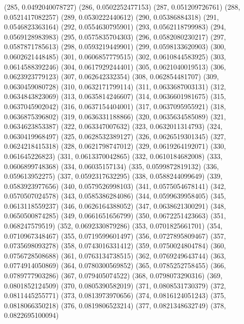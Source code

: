 {					(285, 0.0492040078727)
					(286, 0.0502252477153)
					(287, 0.051209726761)
					(288, 0.0521417082257)
					(289, 0.0530222440612)
					(290, 0.05386884318)
					(291, 0.0546823363164)
					(292, 0.0554630795901)
					(293, 0.0562118799983)
					(294, 0.0569128983983)
					(295, 0.0575835704303)
					(296, 0.0582080230217)
					(297, 0.0587871785613)
					(298, 0.0593219449901)
					(299, 0.0598133620903)
					(300, 0.0602621448485)
					(301, 0.0606857779515)
					(302, 0.0610844583925)
					(303, 0.0614588392246)
					(304, 0.0617929244401)
					(305, 0.0621040019513)
					(306, 0.0623923779123)
					(307, 0.062642332354)
					(308, 0.062854481707)
					(309, 0.0630459080728)
					(310, 0.0632171799114)
					(311, 0.0633687003131)
					(312, 0.0634843823069)
					(313, 0.0635814246607)
					(314, 0.0636601981675)
					(315, 0.0637045902042)
					(316, 0.0637154404001)
					(317, 0.0637095955921)
					(318, 0.0636875396802)
					(319, 0.0636331188866)
					(320, 0.0635634585089)
					(321, 0.0634623853387)
					(322, 0.063347007632)
					(323, 0.0632011314793)
					(324, 0.0630419968497)
					(325, 0.0628532389127)
					(326, 0.0626519301345)
					(327, 0.0624218415318)
					(328, 0.0621798747012)
					(329, 0.0619264192071)
					(330, 0.061645226823)
					(331, 0.0613370042865)
					(332, 0.0610184682008)
					(333, 0.0606899748368)
					(334, 0.06035157134)
					(335, 0.0599872819132)
					(336, 0.059613952275)
					(337, 0.0592317632295)
					(338, 0.0588244099649)
					(339, 0.0583923977656)
					(340, 0.0579526998103)
					(341, 0.0575054678141)
					(342, 0.0570507024578)
					(343, 0.0585386284086)
					(344, 0.0599639958405)
					(345, 0.0613118559237)
					(346, 0.0626164388052)
					(347, 0.0638621300291)
					(348, 0.0650500874285)
					(349, 0.0661651656799)
					(350, 0.0672251423663)
					(351, 0.068247579519)
					(352, 0.0692330879286)
					(353, 0.0701825661701)
					(354, 0.0710967348467)
					(355, 0.0719599601497)
					(356, 0.0727895809467)
					(357, 0.0735698093278)
					(358, 0.0743016331412)
					(359, 0.0750024804784)
					(360, 0.0756728508688)
					(361, 0.0763134738515)
					(362, 0.0769249643744)
					(363, 0.0774914050869)
					(364, 0.0780300569852)
					(365, 0.0785252758455)
					(366, 0.0789777903286)
					(367, 0.079405074522)
					(368, 0.0798073290316)
					(369, 0.0801852124509)
					(370, 0.0805390582019)
					(371, 0.0808531730379)
					(372, 0.0811445255771)
					(373, 0.0813973970656)
					(374, 0.0816124051243)
					(375, 0.0818066350218)
					(376, 0.0819806523214)
					(377, 0.0821348632749)
					(378, 0.0822695100094)
}
